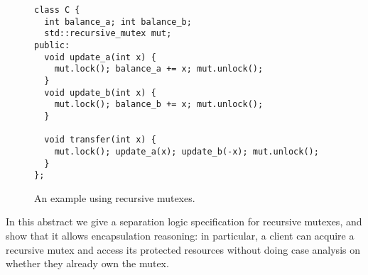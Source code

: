\documentclass[sigplan,screen]{acmart}
\begin{document}

\begin{figure}[h]
  \small
\begin{verbatim}
class C {
  int balance_a; int balance_b;
  std::recursive_mutex mut;
public:
  void update_a(int x) {
    mut.lock(); balance_a += x; mut.unlock();
  }
  void update_b(int x) {
    mut.lock(); balance_b += x; mut.unlock();
  }

  void transfer(int x) {
    mut.lock(); update_a(x); update_b(-x); mut.unlock();
  }
};
\end{verbatim}
  \caption{An example using recursive mutexes.}
  \label{fig:rec-mutex}
\end{figure}

In this abstract we give a separation logic specification for recursive mutexes, and show that it allows encapsulation reasoning: in particular, a client can acquire a recursive mutex and access its protected resources without doing case analysis on whether they already own the mutex. %
\end{document}

